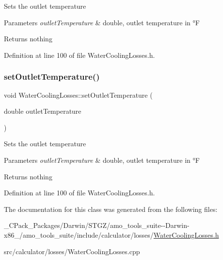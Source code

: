 Sets the outlet temperature


\begin{DoxyParams}{Parameters}
{\em outlet\+Temperature} & double, outlet temperature in °F\\
\hline
\end{DoxyParams}
\begin{DoxyReturn}{Returns}
nothing 
\end{DoxyReturn}


Definition at line 100 of file Water\+Cooling\+Losses.\+h.

\mbox{\label{class_water_cooling_losses_a36bb100df0580a78f63f266cdc1d41f5}} 
\subsubsection{\texorpdfstring{set\+Outlet\+Temperature()}{setOutletTemperature()}\hspace{0.1cm}{\footnotesize\ttfamily [3/3]}}
{\footnotesize\ttfamily void Water\+Cooling\+Losses\+::set\+Outlet\+Temperature (\begin{DoxyParamCaption}\item[{double}]{outlet\+Temperature }\end{DoxyParamCaption})\hspace{0.3cm}{\ttfamily [inline]}}

Sets the outlet temperature


\begin{DoxyParams}{Parameters}
{\em outlet\+Temperature} & double, outlet temperature in °F\\
\hline
\end{DoxyParams}
\begin{DoxyReturn}{Returns}
nothing 
\end{DoxyReturn}


Definition at line 100 of file Water\+Cooling\+Losses.\+h.



The documentation for this class was generated from the following files\+:\begin{DoxyCompactItemize}
\item 
\+\_\+\+C\+Pack\+\_\+\+Packages/\+Darwin/\+S\+T\+G\+Z/amo\+\_\+tools\+\_\+suite-\/-\/\+Darwin-\/x86\+\_/amo\+\_\+tools\+\_\+suite/include/calculator/losses/\hyperlink{___c_pack___packages_2_darwin_2_s_t_g_z_2amo__tools__suite--_darwin-x86__64_2amo__tools__suite_2648016b82c2503c0c1f23360ff1dd754}{Water\+Cooling\+Losses.\+h}\item 
src/calculator/losses/Water\+Cooling\+Losses.\+cpp\end{DoxyCompactItemize}
